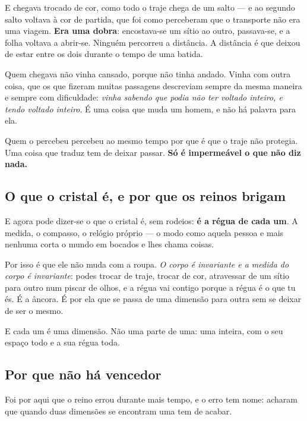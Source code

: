 \documentclass[livro.tex]{subfiles}
\begin{document}
\medskip

E chegava trocado de cor, como todo o traje chega de um salto --- e ao segundo salto voltava à
cor de partida, que foi como perceberam que o transporte não era uma viagem. \textbf{Era uma
dobra}: encostava-se um sítio ao outro, passava-se, e a folha voltava a abrir-se. Ninguém
percorreu a distância. A distância é que deixou de estar entre os dois durante o tempo de uma
batida.

\medskip

Quem chegava não vinha cansado, porque não tinha andado. Vinha com outra coisa, que os que
fizeram muitas passagens descreviam sempre da mesma maneira e sempre com dificuldade: \emph{vinha
sabendo que podia não ter voltado inteiro, e tendo voltado inteiro}. É uma coisa que muda um
homem, e não há palavra para ela.

\medskip

Quem o percebeu percebeu ao mesmo tempo por que é que o traje não protegia. Uma coisa que traduz
tem de deixar passar. \textbf{Só é impermeável o que não diz nada.}



\subsection*{O que o cristal é, e por que os reinos brigam}

E agora pode dizer-se o que o cristal é, sem rodeios: \textbf{é a régua de cada um}. A medida, o
compasso, o relógio próprio --- o modo como aquela pessoa e mais nenhuma corta o mundo em bocados
e lhes chama coisas.

\medskip

Por isso é que ele não muda com a roupa. \emph{O corpo é invariante e a medida do corpo é
invariante}: podes trocar de traje, trocar de cor, atravessar de um sítio para outro num piscar de
olhos, e a régua vai contigo porque a régua é o que tu és. É a âncora. É por ela que se passa de
uma dimensão para outra sem se deixar de ser o mesmo.

\medskip

E cada um é uma dimensão. Não uma parte de uma: uma inteira, com o seu espaço todo e a sua régua
toda.

\subsection*{Por que não há vencedor}

Foi por aqui que o reino errou durante mais tempo, e o erro tem nome: acharam que quando duas
dimensões se encontram uma tem de acabar.
\end{document}
